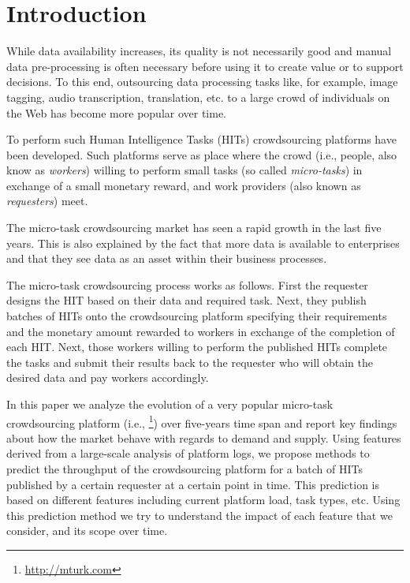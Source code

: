 \section{Introduction}\label{sec:intro}
% 
While data  availability increases, its quality is not necessarily good and manual data pre-processing is often necessary before using it to create value or to support decisions.
% 
To this end, outsourcing  data processing tasks  like, for example, image tagging, audio transcription, translation, etc. to a large crowd of individuals on the Web has become more popular over time.

To perform such Human Intelligence Tasks (HITs) crowdsourcing platforms have been developed. Such platforms serve as place where the crowd (i.e., people, also know as \emph{workers}) willing to perform small tasks (so called \emph{micro-tasks}) in exchange of a small monetary reward, and work providers (also known as \emph{requesters}) meet. 

The micro-task crowdsourcing market has seen a rapid growth in the last five years. This is also explained by the fact that more data is available to enterprises and that they see data as an asset within their business processes.

The  micro-task crowdsourcing process works as follows. First the requester designs the HIT based on their data and required task. Next, they publish batches of HITs onto the crowdsourcing platform specifying their requirements and the monetary amount rewarded to workers in exchange of the completion of each HIT. Next, those workers willing to perform the published HITs complete the tasks and submit their results back to the requester who will obtain the desired data and pay workers accordingly.

In this paper we analyze the evolution of a very popular micro-task crowdsourcing platform (i.e., \amt{}\footnote{\url{http://mturk.com}}) over  five-years time span and report key findings about how
the market behave with regards to demand and supply.
% 
Using features derived from a large-scale analysis of platform logs, we propose methods to predict the throughput of the crowdsourcing platform for a batch of HITs published by a certain requester at a certain point in time. This prediction is based on different features including current platform load, task types, etc. Using this prediction method we try to understand the impact of each feature that we consider, and its scope over time.

